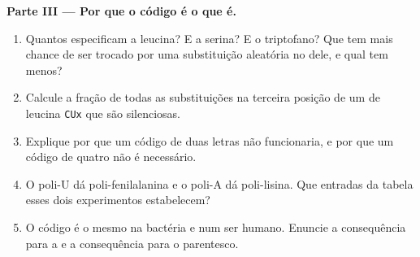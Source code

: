 \begin{problem}
\medskip
\noindent\textbf{Parte III --- Por que o código é o que é.}
\begin{enumerate}[resume]
  \item Quantos  especificam a leucina? E a serina? E o
        triptofano? Que  tem mais chance de ser trocado por
        uma substituição aleatória no  dele, e qual tem menos?
  \item Calcule a fração de todas as substituições na terceira posição
        de um  de leucina \texttt{CUx} que são silenciosas.
  \item Explique por que um código de duas letras não funcionaria, e
        por que um código de quatro não é necessário.
  \item O poli-U dá poli-fenilalanina e o poli-A dá poli-lisina. Que
        entradas da tabela esses dois experimentos estabelecem?
  \item O código é o mesmo na bactéria e num ser humano. Enuncie a
        consequência para a  e a consequência para o
        parentesco.
\end{enumerate}


\end{problem}
